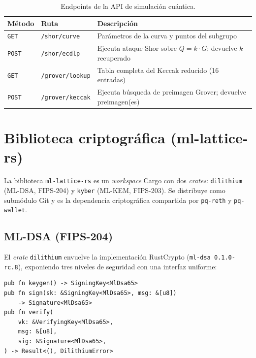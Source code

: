 \begin{table}[htbp]
\centering
\caption{Endpoints de la API de simulación cuántica.}
\label{tab:qiskit_endpoints}
\begin{tabular}{@{}llL{7cm}@{}}
\toprule
\textbf{Método} & \textbf{Ruta} & \textbf{Descripción} \\
\midrule
\texttt{GET} & \texttt{/shor/curve} & Parámetros de la curva y puntos del subgrupo \\
\texttt{POST} & \texttt{/shor/ecdlp} & Ejecuta ataque Shor sobre $Q = k \cdot G$; devuelve $k$ recuperado \\
\texttt{GET} & \texttt{/grover/lookup} & Tabla completa del Keccak reducido (16 entradas) \\
\texttt{POST} & \texttt{/grover/keccak} & Ejecuta búsqueda de preimagen Grover; devuelve preimagen(es) \\
\bottomrule
\end{tabular}
\end{table}


\section{Biblioteca criptográfica (ml-lattice-rs)}
\label{sec:dev_mllattice}

La biblioteca \texttt{ml-lattice-rs} es un \emph{workspace} Cargo con dos \emph{crates}: \texttt{dilithium} (ML-DSA, FIPS-204) y \texttt{kyber} (ML-KEM, FIPS-203). Se distribuye como submódulo Git y es la dependencia criptográfica compartida por \texttt{pq-reth} y \texttt{pq-wallet}.

\subsection{ML-DSA (FIPS-204)}

El \emph{crate} \texttt{dilithium} envuelve la implementación RustCrypto (\texttt{ml-dsa 0.1.0-rc.8}), exponiendo tres niveles de seguridad con una interfaz uniforme:

\begin{lstlisting}[style=rustcode, caption={Interfaz de ml-lattice-rs para ML-DSA-65.}, label={lst:mldsa_api}]
pub fn keygen() -> SigningKey<MlDsa65>
pub fn sign(sk: &SigningKey<MlDsa65>, msg: &[u8])
    -> Signature<MlDsa65>
pub fn verify(
    vk: &VerifyingKey<MlDsa65>,
    msg: &[u8],
    sig: &Signature<MlDsa65>,
) -> Result<(), DilithiumError>
\end{lstlisting}

